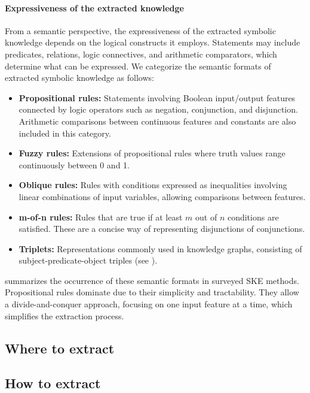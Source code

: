 \paragraph{Expressiveness of the extracted knowledge}
%
From a semantic perspective, the expressiveness of the extracted symbolic knowledge depends on the logical constructs it employs.
%
Statements may include predicates, relations, logic connectives, and arithmetic comparators, which determine what can be expressed.
%
We categorize the semantic formats of extracted symbolic knowledge as follows:
%
\begin{itemize}
    \item \textbf{Propositional rules:} Statements involving Boolean input/output features connected by logic operators such as negation, conjunction, and disjunction.
    Arithmetic comparisons between continuous features and constants are also included in this category.
    \item \textbf{Fuzzy rules:} Extensions of propositional rules where truth values range continuously between 0 and 1.
    \item \textbf{Oblique rules:} Rules with conditions expressed as inequalities involving linear combinations of input variables, allowing comparisons between features.
    \item \textbf{m-of-n rules:} Rules that are true if at least \(m\) out of \(n\) conditions are satisfied.
    These are a concise way of representing disjunctions of conjunctions.
    \item \textbf{Triplets:} Representations commonly used in knowledge graphs, consisting of subject-predicate-object triples (see ).
\end{itemize}

 summarizes the occurrence of these semantic formats in surveyed \gls{SKE} methods.
%
Propositional rules dominate due to their simplicity and tractability.
%
They allow a divide-and-conquer approach, focusing on one input feature at a time, which simplifies the extraction process.

\subsection{Where to extract}\label{subsec:where-to-extract}

\subsection{How to extract}\label{subsec:how-to-extract}

